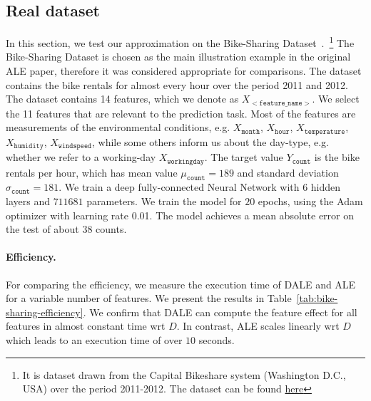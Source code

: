 \documentclass[wcp]{jmlr}
\begin{document}
\subsection{Real dataset}
\label{sec:5-2-real-datasets}
In this section, we test our approximation on the Bike-Sharing
Dataset~\cite{BikeSharing}.~\footnote{It is dataset drawn from the
  Capital Bikeshare system (Washington D.C., USA) over the period
  2011-2012. The dataset can be found
  \href{https://archive.ics.uci.edu/ml/machine-learning-databases/00275/Bike-Sharing-Dataset.zip}{here}}
The Bike-Sharing Dataset is chosen as the main illustration example in
the original ALE paper, therefore it was considered appropriate for
comparisons. The dataset contains the bike rentals for almost every
hour over the period 2011 and 2012. The dataset contains 14 features,
which we denote as \( X_{\mathtt{<feature\_name>}} \). We select the
11 features that are relevant to the prediction task. Most of the
features are measurements of the environmental conditions, e.g.
\(X_{\mathtt{month}}\), \(X_{\mathtt{hour}}\),
\(X_{\mathtt{temperature}}\), \(X_{\mathtt{humidity}}\),
\(X_{\mathtt{windspeed}}\), while some others inform us about the
day-type, e.g. whether we refer to a working-day
\(X_{\mathtt{workingday}}\). The target value \( Y_{\mathtt{count}}\)
is the bike rentals per hour, which has mean value
\(\mu_{\mathtt{count}} = 189\) and standard deviation
\(\sigma_{\mathtt{count}} = 181\). We train a deep fully-connected
Neural Network with 6 hidden layers and \(711681\) parameters. We
train the model for \(20\) epochs, using the Adam optimizer with
learning rate 0.01. The model achieves a mean absolute error on the
test of about \(38\) counts.

\paragraph{Efficiency.} For comparing the efficiency, we measure the
execution time of DALE and ALE for a variable number of features. We
present the results in Table~\ref{tab:bike-sharing-efficiency}. We
confirm that DALE can compute the feature effect for all features in
almost constant time wrt \(D\). In contrast, ALE scales linearly wrt
\(D\) which leads to an execution time of over \(10\) seconds.
\end{document}
